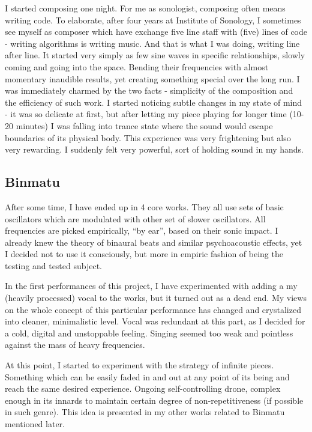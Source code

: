 \documentclass[12pt,a4paper,oneside]{report}
\begin{document}
I started composing one night. For me as sonologist, composing often means writing code. To elaborate, after four years at Institute of Sonology, I sometimes see myself as composer which have exchange five line staff with (five) lines of code - writing algorithms is writing music. And that is what I was doing, writing line after line. It started very simply as few sine waves in specific relationships, slowly coming and going into the space. Bending their frequencies with almost momentary inaudible results, yet creating something special over the long run. I was immediately charmed by the two facts - simplicity of the composition and the efficiency of such work. I started noticing subtle changes in my state of mind - it was so delicate at first, but after letting my piece playing for longer time (10-20 minutes) I was falling into trance state where the sound would escape boundaries of its physical body. This experience was very frightening but also very rewarding. I suddenly felt very powerful, sort of holding sound in my hands. 

\subsection{Binmatu} After some time, I have ended up in 4 core works. They all use sets of basic oscillators which are modulated with other set of slower oscillators. All frequencies are picked empirically, ``by ear'', based on their sonic impact. I already knew the theory of binaural beats and similar psychoacoustic effects, yet I decided not to use it consciously, but more in empiric fashion of being the testing and tested subject.

In the first performances of this project, I have experimented with adding a my (heavily processed) vocal to the works, but it turned out as a dead end. My views on the whole concept of this particular performance has changed and crystalized into cleaner, minimalistic level. Vocal was redundant at this part, as I decided for a cold, digital and unstoppable feeling. Singing seemed too weak and pointless against the mass of heavy frequencies. 

At this point, I started to experiment with the strategy of infinite pieces. Something which can be easily faded in and out at any point of its being and reach the same desired experience. Ongoing self-controlling drone, complex enough in its innards to maintain certain degree of non-repetitiveness (if possible in such genre). This idea is presented in my other works related to Binmatu mentioned later. 
\end{document}
